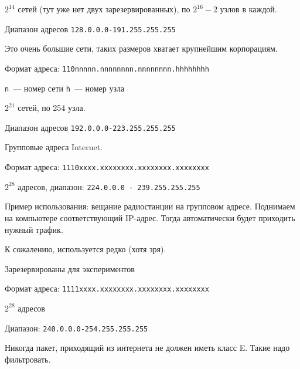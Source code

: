 $2^{14}$ сетей (тут уже нет двух зарезервированных), по $2^{16}-2$ узлов в каждой.

Диапазон адресов {\tt 128.0.0.0-191.255.255.255}

Это очень большие сети, таких размеров хватает крупнейшим корпорациям.


Формат адреса: {\tt 110nnnnn.nnnnnnnn.nnnnnnnn.hhhhhhhh}

{\tt n}~--- номер сети
{\tt h}~--- номер узла

$2^{21}$ сетей, по 254 узла.

Диапазон адресов {\tt 192.0.0.0-223.255.255.255}


Групповые адреса Internet.

Формат адреса: {\tt 1110xxxx.xxxxxxxx.xxxxxxxx.xxxxxxxx}

$2^{28}$ адресов, диапазон: {\tt 224.0.0.0 - 239.255.255.255}

Пример использования: вещание радиостанции на групповом адресе. Поднимаем на компьютере соответствующий IP-адрес. Тогда автоматически будет приходить нужный трафик.

К сожалению, используется редко (хотя зря).


Зарезервированы для экспериментов

Формат адреса: {\tt 1111xxxx.xxxxxxxx.xxxxxxxx.xxxxxxxx}

$2^{28}$ адресов

Диапазон: {\tt 240.0.0.0-254.255.255.255}

Никогда пакет, приходящий из интернета не должен иметь класс E. Такие надо фильтровать.


